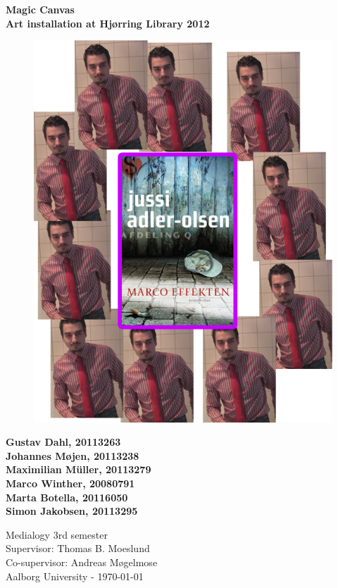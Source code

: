 \thispagestyle{empty} %
\hspace{6cm} \vspace{0.1cm}
\begin{center}
\textbf{\Huge {Magic Canvas}\\ \vspace{1cm}
\huge{Art installation at Hj{\o}rring Library 2012}}
\begin{figure} [H]
\includegraphics[width=1.0\textwidth]{marco_effekten}
\centering
\label{building_diagonal_edge}
\end{figure}
\end{center}
\begin{center}
\Large{\textbf{Gustav Dahl, 20113263 \\ Johannes M{\o}jen, 20113238
\\ Maximilian M\"uller, 20113279 \\ Marco Winther, 20080791 \\ Marta Botella, 20116050
\\ Simon Jakobsen, 20113295}}
\end{center}
\vfill
Medialogy 3rd semester\\
Supervisor: Thomas B. Moeslund\\
Co-supervisor: Andreas M{\o}gelmose\\
Aalborg University - \today
\setcounter{page}{0}
